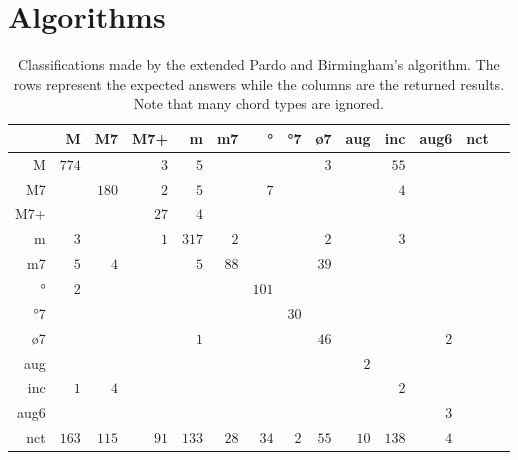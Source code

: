 \documentclass{article}
\begin{document}
\section{Algorithms}
\label{sec:algorithms}

\begin{table*}
\centering
\begin{tabular}{r||r|r|r|r|r|r|r|r|r|r|r|r|r}
      &     M &    M7 &   M7+ &     m &    m7 &    ° &   °7 &   ø7 &   aug &   inc &  aug6 &   nct \\  \hline \hline
    M & $ 774 $ & $     $ & $   3 $ & $   5 $ & $     $ & $     $ & $     $ & $   3 $ & $     $ & $  55 $ & $     $ & $     $ \\ \hline
   M7 & $     $ & $ 180 $ & $   2 $ & $   5 $ & $     $ & $   7 $ & $     $ & $     $ & $     $ & $   4 $ & $     $ & $     $ \\ \hline
  M7+ & $     $ & $     $ & $  27 $ & $   4 $ & $     $ & $     $ & $     $ & $     $ & $     $ & $     $ & $     $ & $     $ \\ \hline
    m & $   3 $ & $     $ & $   1 $ & $ 317 $ & $   2 $ & $     $ & $     $ & $   2 $ & $     $ & $   3 $ & $     $ & $     $ \\ \hline
   m7 & $   5 $ & $   4 $ & $     $ & $   5 $ & $  88 $ & $     $ & $     $ & $  39 $ & $     $ & $     $ & $     $ & $     $ \\ \hline
   ° & $   2 $ & $     $ & $     $ & $     $ & $     $ & $ 101 $ & $     $ & $     $ & $     $ & $     $ & $     $ & $     $ \\ \hline
  °7 & $     $ & $     $ & $     $ & $     $ & $     $ & $     $ & $  30 $ & $     $ & $     $ & $     $ & $     $ & $     $ \\ \hline
  ø7 & $     $ & $     $ & $     $ & $   1 $ & $     $ & $     $ & $     $ & $  46 $ & $     $ & $     $ & $   2 $ & $     $ \\ \hline
  aug & $     $ & $     $ & $     $ & $     $ & $     $ & $     $ & $     $ & $     $ & $   2 $ & $     $ & $     $ & $     $ \\ \hline
  inc & $   1 $ & $   4 $ & $     $ & $     $ & $     $ & $     $ & $     $ & $     $ & $     $ & $   2 $ & $     $ & $     $ \\ \hline
 aug6 & $     $ & $     $ & $     $ & $     $ & $     $ & $     $ & $     $ & $     $ & $     $ & $     $ & $   3 $ & $     $ \\ \hline
  nct & $ 163 $ & $ 115 $ & $  91 $ & $ 133 $ & $  28 $ & $  34 $ & $   2 $ & $  55 $ & $  10 $ & $ 138 $ & $   4 $ & $     $ \\ \hline
\end{tabular}

\caption{Classifications made by the extended Pardo and Birmingham's algorithm. The rows represent
  the expected answers while the columns are the returned
  results. Note that many chord types are ignored.}
\label{tab:erros-ES-pb}
\end{table*}
\end{document}
